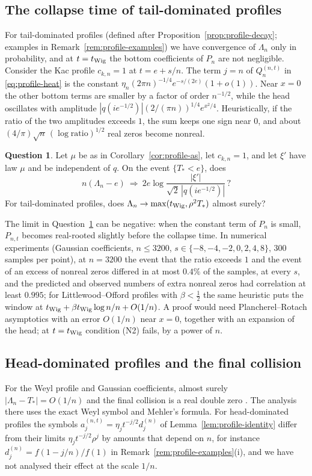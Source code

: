 \documentclass[11pt]{amsart}
\theoremstyle{definition}
\newtheorem{question}[theorem]{Question}
\theoremstyle{remark}
\numberwithin{equation}{section}
\begin{document}
\subsection{The collapse time of tail-dominated profiles}\label{subsec:kac}
For tail-dominated profiles (defined after Proposition~\ref{prop:profile-decay}; examples in Remark~\ref{rem:profile-examples}) we have convergence of $\Lambda_n$ only in probability, and at $t=t_{\rm Wig}$ the bottom coefficients of $P_n$ are not negligible. Consider the Kac profile $c_{k,n}=1$ at $t=e+s/n$. The term $j=n$ of $Q^{(n,t)}_n$ in \eqref{eq:profile-heat} is the constant $\eta_n(2\pi n)^{-1/4}e^{-s/(2e)}(1+o(1))$. Near $x=0$ the other bottom terms are smaller by a factor of order $n^{-1/2}$, while the head oscillates with amplitude $|q(ie^{-1/2})|(2/(\pi n))^{1/4}e^{x^2/4}$. Heuristically, if the ratio of the two amplitudes exceeds $1$, the sum keeps one sign near $0$, and about $(4/\pi)\sqrt n\,(\log\text{ratio})^{1/2}$ real zeros become nonreal.

\begin{question}\label{q:kac-window}
Let $\mu$ be as in Corollary~\ref{cor:profile-as}, let $c_{k,n}=1$, and let $\xi'$ have law $\mu$ and be independent of $q$. On the event $\{T_*<e\}$, does
\[
n(\Lambda_n-e)\ \Rightarrow\ 2e\log\frac{|\xi'|}{\sqrt2\,|q(ie^{-1/2})|}\,?
\]
For tail-dominated profiles, does $\Lambda_n\to\max(t_{\rm Wig},\rho^2T_*)$ almost surely?
\end{question}

The limit in Question~\ref{q:kac-window} can be negative: when the constant term of $P_n$ is small, $P_{n,t}$ becomes real-rooted slightly before the collapse time. In numerical experiments (Gaussian coefficients, $n\le3200$, $s\in\{-8,-4,-2,0,2,4,8\}$, $300$ samples per point), at $n=3200$ the event that the ratio exceeds $1$ and the event of an excess of nonreal zeros differed in at most $0.4\%$ of the samples, at every $s$, and the predicted and observed numbers of extra nonreal zeros had correlation at least $0.995$; for Littlewood--Offord profiles with $\beta<\frac12$ the same heuristic puts the window at $t_{\rm Wig}+\beta t_{\rm Wig}\log n/n+O(1/n)$. A proof would need Plancherel--Rotach asymptotics with an error $O(1/n)$ near $x=0$, together with an expansion of the head; at $t=t_{\rm Wig}$ condition (N2) fails, by a power of $n$.

\subsection{Head-dominated profiles and the final collision}
For the Weyl profile and Gaussian coefficients, almost surely $|\Lambda_n-T_*|=O(1/n)$ and the final collision is a real double zero \cite[Corollary~\ref{M-cor:collision-gauss}]{Main}. The analysis there uses the exact Weyl symbol and Mehler's formula. For head-dominated profiles the symbols $a^{(n,t)}_j=\eta_jt^{-j/2}d^{(n)}_j$ of Lemma~\ref{lem:profile-identity} differ from their limits $\eta_jt^{-j/2}\rho^j$ by amounts that depend on $n$, for instance $d^{(n)}_j=f(1-j/n)/f(1)$ in Remark~\ref{rem:profile-examples}(i), and we have not analysed their effect at the scale $1/n$.
\end{document}
